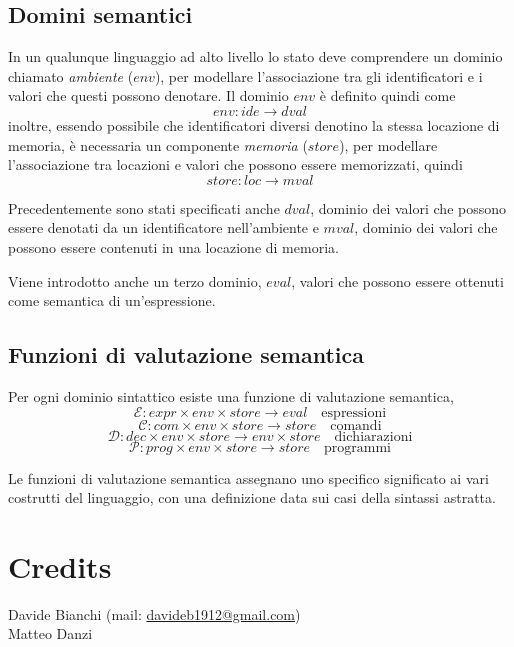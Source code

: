 \documentclass{article}[10pt]
\begin{document}
	\subsection{Domini semantici}
	In un qualunque linguaggio ad alto livello lo stato deve comprendere un dominio chiamato \textit{ambiente} ($env$), per modellare l'associazione tra gli identificatori e i valori che questi possono denotare. Il dominio $env$ è definito quindi come $$env:ide \to dval$$ inoltre, essendo possibile che identificatori diversi denotino la stessa locazione di memoria, è necessaria un componente \textit{memoria} ($store$), per modellare l'associazione tra locazioni e valori che possono essere memorizzati, quindi $$store:loc \to mval$$
	
	Precedentemente sono stati specificati anche $dval$, dominio dei valori che possono essere denotati da un identificatore nell'ambiente e $mval$, dominio dei valori che possono essere contenuti in una locazione di memoria.
	
	Viene introdotto anche un terzo dominio, $eval$, valori che possono essere ottenuti come semantica di un'espressione.
	
	\subsection{Funzioni di valutazione semantica}
	Per ogni dominio sintattico esiste una funzione di valutazione semantica, 
	$$\mathcal{E}:expr \times env \times store \to eval \quad \text{espressioni}$$
	$$\mathcal{C}:com \times env \times store \to store \quad \text{comandi}$$
	$$\mathcal{D}:dec \times env \times store \to env \times store \quad \text{dichiarazioni}$$
	$$\mathcal{P}:prog \times env \times store \to store \quad \text{programmi}$$
	
	Le funzioni di valutazione semantica assegnano uno specifico significato ai vari costrutti del linguaggio, con una definizione data sui casi della sintassi astratta.
	\newpage
	
	\section{Credits}
	Davide Bianchi (mail: \url{davideb1912@gmail.com}) \\
	Matteo Danzi
	
\end{document}
